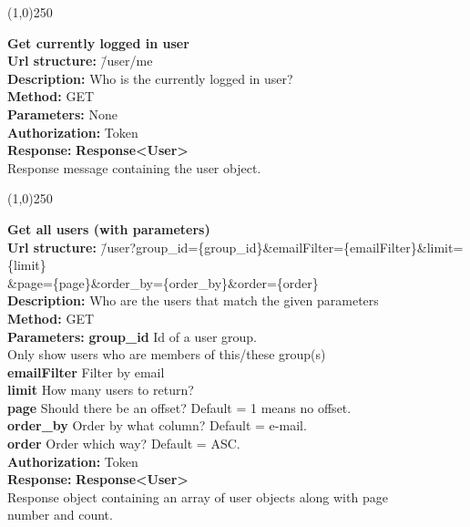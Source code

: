 \documentclass[11pt]{article}
\begin{document}
\begin{center}\line(1,0){250}\end{center}

\begin{tabbing}
\textbf{Get currently logged in user} \\
\textcolor{black!60}{\textbf{Url structure:}} \hspace{0.2in} \= /user/me \\
\textcolor{black!60}{\textbf{Description:}}  \> Who is the currently logged in user? \\
\textcolor{black!60}{\textbf{Method:}} \> GET \\
\textcolor{black!60}{\textbf{Parameters:}}  \> None \\
\textcolor{black!60}{\textbf{Authorization:}} \> Token \\
\textcolor{black!60}{\textbf{Response:}} \> \textbf{Response<User>} \\
\> Response message containing the user object.
\end{tabbing}

\begin{center}\line(1,0){250}\end{center}

\begin{tabbing}
\textbf{Get all users (with parameters)} \\
\textcolor{black!60}{\textbf{Url structure:}} \hspace{0.2in} \= /user?group\_id=\{group\_id\}\&emailFilter=\{emailFilter\}\&limit=\{limit\}
\\ \> \&page=\{page\}\&order\_by=\{order\_by\}\&order=\{order\} \\
\textcolor{black!60}{\textbf{Description:}}  \> Who are the users that match the given parameters \\
\textcolor{black!60}{\textbf{Method:}} \> GET \\
\textcolor{black!60}{\textbf{Parameters:}} \> \textbf{group\_id} Id of a user group. \\ \> Only show users who are members of this/these group(s) \\
\> \textbf{emailFilter} Filter by email \\
\> \textbf{limit} How many users to return? \\
\> \textbf{page} Should there be an offset? Default = 1 means no offset. \\
\> \textbf{order\_by} Order by what column? Default = e-mail. \\
\> \textbf{order} Order which way? Default = ASC. \\
\textcolor{black!60}{\textbf{Authorization:}} \> Token \\
\textcolor{black!60}{\textbf{Response:}} \> \textbf{Response<User>} \\
\> Response object containing an array of user objects along with page \\ \> number and count.
\end{tabbing}
\end{document}
